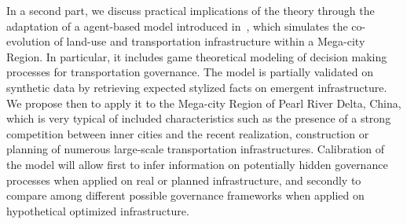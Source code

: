 In a second part, we discuss practical implications of the theory through the adaptation of a agent-based model introduced in~\cite{le2015modeling}, which simulates the co-evolution of land-use and transportation infrastructure within a Mega-city Region. In particular, it includes game theoretical modeling of decision making processes for transportation governance. The model is partially validated on synthetic data by retrieving expected stylized facts on emergent infrastructure. We propose then to apply it to the Mega-city Region of Pearl River Delta, China, which is very typical of included characteristics such as the presence of a strong competition between inner cities and the recent realization, construction or planning of numerous large-scale transportation infrastructures. Calibration of the model will allow first to infer information on potentially hidden governance processes when applied on real or planned infrastructure, and secondly to compare among different possible governance frameworks when applied on hypothetical optimized infrastructure.



\bigskip
\bigskip











